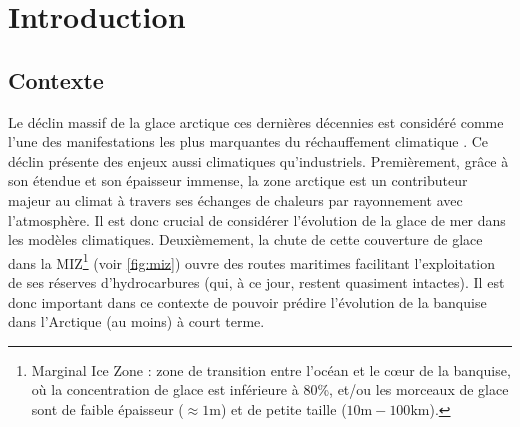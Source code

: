 
\chapter{Introduction} %

\label{Chapter1} %


\newcommand{\keyword}[1]{\textbf{#1}}
\newcommand{\tabhead}[1]{\textbf{#1}}
\newcommand{\code}[1]{\texttt{#1}}
\newcommand{\file}[1]{\texttt{\bfseries#1}}
\newcommand{\option}[1]{\texttt{\itshape#1}}









\section{Contexte}



Le déclin massif de la glace arctique ces dernières décennies est considéré comme l'une des manifestations les plus marquantes du réchauffement climatique \parencite{stroeve2012trends}. Ce déclin présente des enjeux aussi climatiques qu'industriels. Premièrement, grâce à son étendue et son épaisseur immense, la zone arctique est un contributeur majeur au climat à travers ses échanges de chaleurs par rayonnement avec l'atmosphère. Il est donc crucial de considérer l'évolution de la glace de mer dans les modèles climatiques. Deuxièmement, la chute de cette couverture de glace dans la MIZ\footnote{Marginal Ice Zone : zone de transition entre l’océan et le c\oe{}ur de la banquise, où la concentration de glace est inférieure à $80$\%, et/ou les morceaux de glace sont de faible épaisseur ($\approx 1 \text{m}$) et de petite taille ($10 \text{m} - 100 \text{km}$).} (voir \cref{fig:miz}) ouvre des routes maritimes facilitant l'exploitation de ses réserves d’hydrocarbures (qui, à ce jour, restent quasiment intactes). Il est donc important dans ce contexte de pouvoir prédire l'évolution de la banquise dans l'Arctique (au moins) à court terme.


